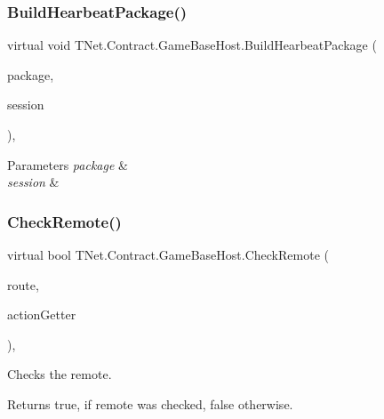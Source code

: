 \subsubsection{\texorpdfstring{Build\+Hearbeat\+Package()}{BuildHearbeatPackage()}}
{\footnotesize\ttfamily virtual void T\+Net.\+Contract.\+Game\+Base\+Host.\+Build\+Hearbeat\+Package (\begin{DoxyParamCaption}\item[{\mbox{\hyperlink{class_t_net_1_1_contract_1_1_request_package}{Request\+Package}}}]{package,  }\item[{\mbox{\hyperlink{class_t_net_1_1_contract_1_1_game_session}{Game\+Session}}}]{session }\end{DoxyParamCaption})\hspace{0.3cm}{\ttfamily [protected]}, {\ttfamily [virtual]}}






\begin{DoxyParams}{Parameters}
{\em package} & \\
\hline
{\em session} & \\
\hline
\end{DoxyParams}
\mbox{\label{class_t_net_1_1_contract_1_1_game_base_host_af31cfeb1a622a263f4d32bd56f41bc64}} 
\subsubsection{\texorpdfstring{Check\+Remote()}{CheckRemote()}}
{\footnotesize\ttfamily virtual bool T\+Net.\+Contract.\+Game\+Base\+Host.\+Check\+Remote (\begin{DoxyParamCaption}\item[{string}]{route,  }\item[{\mbox{\hyperlink{class_t_net_1_1_service_1_1_action_getter}{Action\+Getter}}}]{action\+Getter }\end{DoxyParamCaption})\hspace{0.3cm}{\ttfamily [protected]}, {\ttfamily [virtual]}}



Checks the remote. 

\begin{DoxyReturn}{Returns}
{\ttfamily true}, if remote was checked, {\ttfamily false} otherwise.
\end{DoxyReturn}

